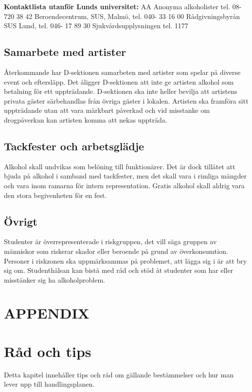 \documentclass[]{dsekprotokoll}
\begin{document}
\textbf{Kontaktlista utanför Lunds universitet:}\newline
AA Anonyma alkoholister tel. 08-720 38 42\newline
Beroendecentrum, SUS, Malmö, tel. 040- 33 16 00\newline
Rådgivningsbyrån SUS Lund, tel. 046- 17 89 30\newline
Sjukvårdsupplysningen tel. 1177

\subsection{Samarbete med artister}
Återkommande har D-sektionen samarbeten med artister som spelar på diverse event och eftersläpp. Det åligger D-sektionen att inte ge artisten alkohol som betalning för ett uppträdande. D-sektionen ska inte heller bevilja att artistens privata gäster särbehandlas
från övriga gäster i lokalen. Artisten ska framföra sitt uppträdande utan att vara märkbart
påverkad och vid misstanke om drogpåverkan kan artisten komma att nekas uppträda.

\subsection{Tackfester och arbetsglädje}
Alkohol skall undvikas som belöning till funktionärer. Det är dock tillåtet att bjuda på alkohol i samband med tackfester, men det skall vara i rimliga mängder och vara inom ramarna för intern representation. Gratis alkohol skall aldrig vara den stora begivenheten för en fest.

\subsection{Övrigt}
Studenter är överrepresenterade i riskgruppen, det vill säga gruppen av människor som riskerar skador eller beroende på grund av överkonsumtion. Personer i riskzonen ska uppmärksammas på problemet, att lägga sig i är att bry sig om. Studenthälsan kan bistå med råd och stöd åt studenter som har eller misstänker sig ha alkoholproblem.

\section*{APPENDIX}
\section{Råd och tips}
Detta kapitel innehåller tips och råd om gällande bestämmelser och hur man lever upp till
handlingsplanen.
\end{document}
